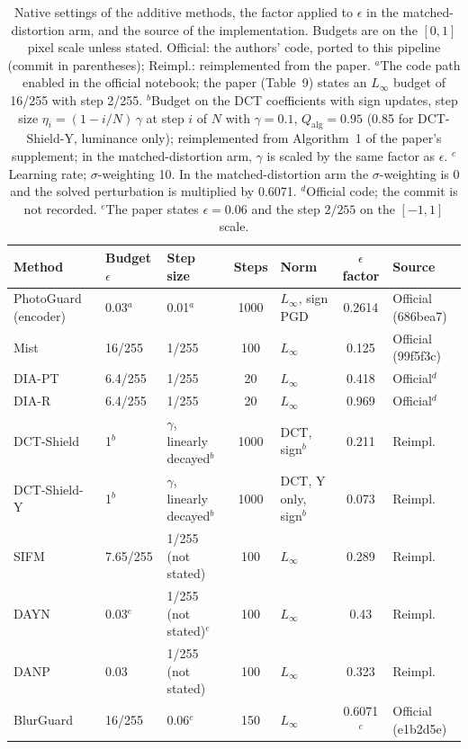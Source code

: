 \begin{table}[t]
  \centering
  \footnotesize
  \setlength{\tabcolsep}{5pt}
  \caption{Native settings of the additive methods, the factor applied to $\epsilon$ in the matched-distortion arm, and the source of the implementation. Budgets are on the $[0, 1]$ pixel scale unless stated. Official: the authors' code, ported to this pipeline (commit in parentheses); Reimpl.: reimplemented from the paper. $^{a}$The code path enabled in the official notebook; the paper (Table~9) states an $L_\infty$ budget of 16/255 with step 2/255. $^{b}$Budget on the DCT coefficients with sign updates, step size $\eta_i = (1 - i/N)\,\gamma$ at step $i$ of $N$ with $\gamma = 0.1$, $Q_{\mathrm{alg}} = 0.95$ (0.85 for DCT-Shield-Y, luminance only); reimplemented from Algorithm~1 of the paper's supplement; in the matched-distortion arm, $\gamma$ is scaled by the same factor as $\epsilon$. $^{c}$Learning rate; $\sigma$-weighting 10. In the matched-distortion arm the $\sigma$-weighting is 0 and the solved perturbation is multiplied by 0.6071. $^{d}$Official code; the commit is not recorded. $^{e}$The paper states $\epsilon = 0.06$ and the step $2/255$ on the $[-1, 1]$ scale.}
  \label{tab:supp_provenance}
  \begin{tabular}{@{}l l l c l c l@{}}
    \toprule
    Method & Budget $\epsilon$ & Step size & Steps & Norm & $\epsilon$ factor & Source \\
    \midrule
    PhotoGuard (encoder)~\cite{salman2023photoguard} & 0.03$^{a}$ & 0.01$^{a}$ & 1000 & $L_\infty$, sign PGD & 0.2614 & Official (686bea7) \\
    Mist~\cite{liang2023mist} & 16/255 & 1/255 & 100 & $L_\infty$ & 0.125 & Official (99f5f3c) \\
    DIA-PT~\cite{dia2025} & 6.4/255 & 1/255 & 20 & $L_\infty$ & 0.418 & Official$^{d}$ \\
    DIA-R~\cite{dia2025} & 6.4/255 & 1/255 & 20 & $L_\infty$ & 0.969 & Official$^{d}$ \\
    DCT-Shield~\cite{dctshield2025} & 1$^{b}$ & $\gamma$, linearly decayed$^{b}$ & 1000 & DCT, sign$^{b}$ & 0.211 & Reimpl. \\
    DCT-Shield-Y~\cite{dctshield2025} & 1$^{b}$ & $\gamma$, linearly decayed$^{b}$ & 1000 & DCT, Y only, sign$^{b}$ & 0.073 & Reimpl. \\
    SIFM~\cite{dong2025sifm} & 7.65/255 & 1/255 (not stated) & 100 & $L_\infty$ & 0.289 & Reimpl. \\
    DAYN~\cite{lo2024dayn} & 0.03$^{e}$ & 1/255 (not stated)$^{e}$ & 100 & $L_\infty$ & 0.43 & Reimpl. \\
    DANP~\cite{zhang2025danp} & 0.03 & 1/255 (not stated) & 100 & $L_\infty$ & 0.323 & Reimpl. \\
    BlurGuard~\cite{blurguard2025} & 16/255 & 0.06$^{c}$ & 150 & $L_\infty$ & 0.6071$^{c}$ & Official (e1b2d5e) \\
    \bottomrule
  \end{tabular}
\end{table}

